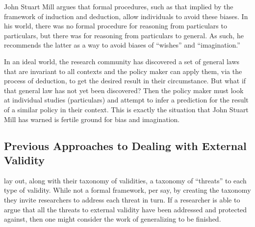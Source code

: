 \documentclass[a4paper,12pt]{article}
\begin{document}
John Stuart Mill argues that formal procedures, such as that implied by the framework of induction and deduction, allow individuals to avoid these biases. In his world, there was no formal procedure for reasoning from particulars to particulars, but there was for reasoning from particulars to general. As such, he recommends the latter as a way to avoid biases of ``wishes'' and ``imagination.''

In an ideal world, the research community has discovered a set of general laws that are invariant to all contexts and the policy maker can apply them, via the process of deduction, to get the desired result in their circumstance. But what if that general law has not yet been discovered? Then the policy maker must look at individual studies (particulars) and attempt to infer a prediction for the result of a similar policy in their context. This is exactly the situation that John Stuart Mill has warned is fertile ground for bias and imagination. 



\subsection*{Previous Approaches to Dealing with External Validity }

\cite{Shadish2002} lay out, along with their taxonomy of validities, a taxonomy of ``threats'' to each type of validity. While not a formal framework, per say, by creating the taxonomy they invite researchers to address each threat in turn. If a researcher is able to argue that all the threats to external validity have been addressed and protected against, then one might consider the work of generalizing to be finished. 
\end{document}
